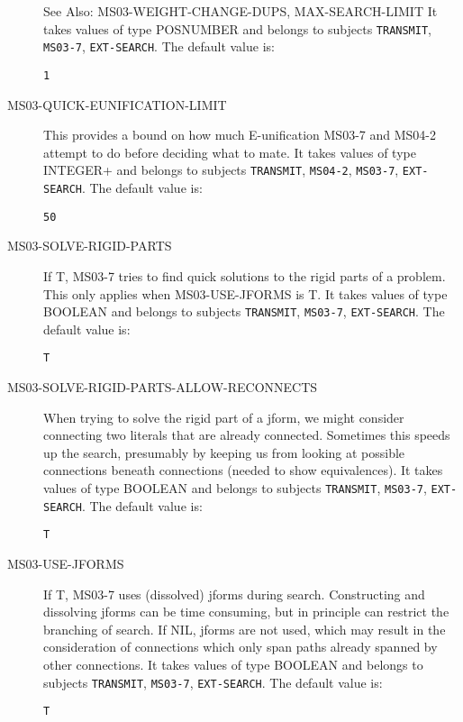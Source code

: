 \begin{description}
See Also: MS03-WEIGHT-CHANGE-DUPS, MAX-SEARCH-LIMIT
It takes values of type POSNUMBER and belongs to subjects \texttt{TRANSMIT}, \texttt{MS03-7}, \texttt{EXT-SEARCH}.  The default value is: \begin{lstlisting}
1
\end{lstlisting}

\item[MS03-QUICK-EUNIFICATION-LIMIT]  
This provides a bound on how much E-unification MS03-7 and MS04-2 attempt to do
before deciding what to mate.
It takes values of type INTEGER+ and belongs to subjects \texttt{TRANSMIT}, \texttt{MS04-2}, \texttt{MS03-7}, \texttt{EXT-SEARCH}.  The default value is: \begin{lstlisting}
50
\end{lstlisting}

\item[MS03-SOLVE-RIGID-PARTS]  
If T, MS03-7 tries to find quick solutions to the rigid parts of a
problem.  This only applies when MS03-USE-JFORMS is T.
It takes values of type BOOLEAN and belongs to subjects \texttt{TRANSMIT}, \texttt{MS03-7}, \texttt{EXT-SEARCH}.  The default value is: \begin{lstlisting}
T
\end{lstlisting}

\item[MS03-SOLVE-RIGID-PARTS-ALLOW-RECONNECTS]  
When trying to solve the rigid part of a jform,
we might consider connecting two literals that are already connected.
Sometimes this speeds up the search, presumably by keeping
us from looking at possible connections beneath connections (needed to show
equivalences).
It takes values of type BOOLEAN and belongs to subjects \texttt{TRANSMIT}, \texttt{MS03-7}, \texttt{EXT-SEARCH}.  The default value is: \begin{lstlisting}
T
\end{lstlisting}

\item[MS03-USE-JFORMS]  
If T, MS03-7 uses (dissolved) jforms during search.
Constructing and dissolving jforms can be time consuming, but in
principle can restrict the branching of search.  If NIL, jforms
are not used, which may result in the consideration of connections
which only span paths already spanned by other connections.
It takes values of type BOOLEAN and belongs to subjects \texttt{TRANSMIT}, \texttt{MS03-7}, \texttt{EXT-SEARCH}.  The default value is: \begin{lstlisting}
T
\end{lstlisting}


\end{description}
